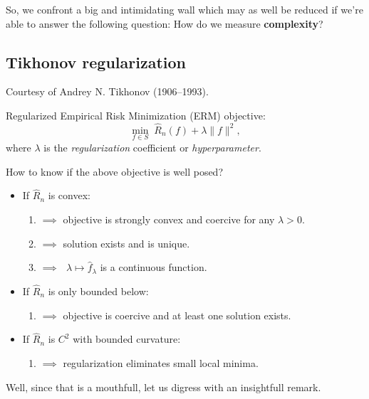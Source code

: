 \medskip

So, we confront a big and intimidating wall which may as well be reduced if we're able to answer the following question: How do we measure \textbf{complexity}?

\subsection*{Tikhonov regularization}
Courtesy of Andrey N. Tikhonov (1906--1993).

\medskip

\noindent Regularized Empirical Risk Minimization (ERM) objective:
\[
\min_{f \in S} \; \hat R_n(f) + \lambda \|f\|^2,
\]
where $\lambda$ is the \textit{regularization} coefficient or \textit{hyperparameter}.

\medskip

\begin{proposition} How to know if the above objective is well posed?
    \begin{itemize}
        \item If $\hat R_n$ is convex:
        \begin{enumerate} 
            \item $\implies$ objective is strongly convex and coercive for any $\lambda > 0$.
            \item $\implies$ solution exists and is unique.
            \item $\implies \text{  }\lambda \mapsto \hat f_\lambda$ is a continuous function.
        \end{enumerate}
        \item If $\hat R_n$ is only bounded below:
        \begin{enumerate}
            \item $\implies$ objective is coercive and at least one solution exists.
        \end{enumerate}
        \item If $\hat R_n$ is $C^2$ with bounded curvature:
        \begin{enumerate}
            \item $\implies$ regularization eliminates small local minima.
        \end{enumerate}
    \end{itemize}
\end{proposition}

Well, since that is a mouthfull, let us digress with an insightfull remark.


